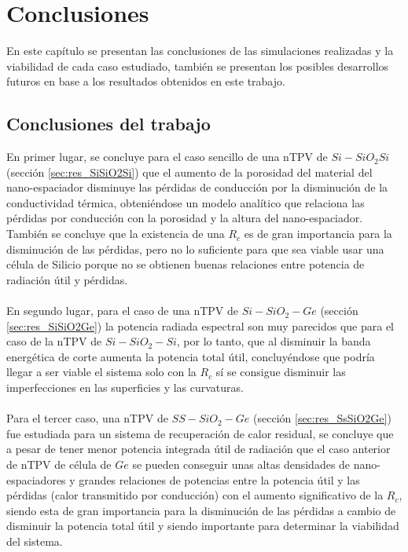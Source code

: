 \chapter{Conclusiones}
En este capítulo se presentan las conclusiones de las simulaciones realizadas y la viabilidad de cada caso estudiado, también se presentan los posibles desarrollos futuros en base a los resultados obtenidos en este trabajo.

\section{Conclusiones del trabajo}
En primer lugar, se concluye para el caso sencillo de una nTPV de $Si-SiO_2Si$ (sección \ref{sec:res_SiSiO2Si}) que el aumento de la porosidad del material del nano-espaciador disminuye las pérdidas de conducción por la disminución de la conductividad térmica, obteniéndose un modelo analítico que relaciona las pérdidas por conducción con la porosidad y la altura del nano-espaciador. También se concluye que la existencia de una $R_c$ es de gran importancia para la disminución de las pérdidas, pero no lo suficiente para que sea viable usar una célula de Silicio porque no se obtienen buenas relaciones entre potencia de radiación útil y pérdidas.\\\\
En segundo lugar, para el caso de una nTPV de $Si-SiO_2-Ge$ (sección \ref{sec:res_SiSiO2Ge}) la potencia radiada espectral son muy parecidos que para el caso de la nTPV de $Si-SiO_2-Si$, por lo tanto, que al disminuir la banda energética de corte aumenta la potencia total útil, concluyéndose que podría llegar a ser viable el sistema solo con la $R_c$ sí se consigue disminuir las imperfecciones en las superficies y las curvaturas.\\\\
Para el tercer caso, una nTPV de $SS-SiO_2-Ge$ (sección \ref{sec:res_SsSiO2Ge}) fue estudiada para un sistema de recuperación de calor residual, se concluye que a pesar de tener menor potencia integrada útil de radiación que el caso anterior de nTPV de célula de $Ge$ se pueden conseguir unas altas densidades de nano-espaciadores y grandes relaciones de potencias entre la potencia útil y las pérdidas (calor transmitido por conducción) con el aumento significativo de la $R_c$, siendo esta de gran importancia para la disminución de las pérdidas a cambio de disminuir la potencia total útil y siendo importante para determinar la viabilidad del sistema.\\\\
